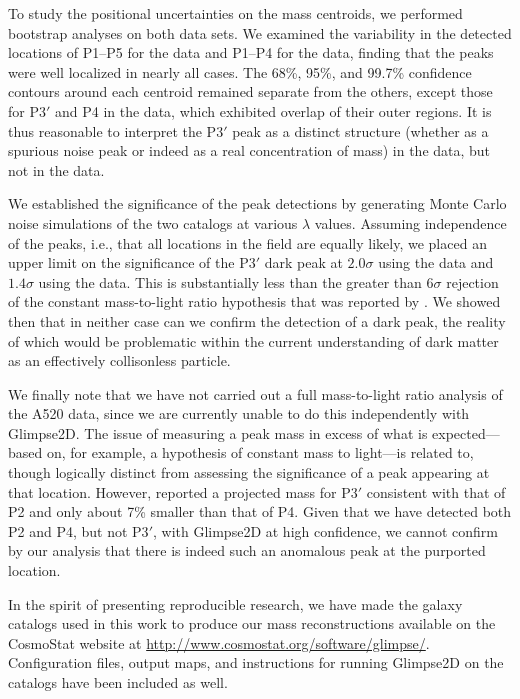 \documentclass[iop,twocolappendix]{emulateapj}
\newcommand{\cta}[1]{\citetalias{#1}}
\begin{document}
To study the positional uncertainties on the mass centroids, we performed bootstrap analyses on
both data sets. We examined the variability in the detected locations of P1--P5 for the \cta{C12} data 
and P1--P4 for the \cta{J14} data, finding that the peaks were well localized in nearly all cases. The
68\%, 95\%, and 99.7\% confidence contours around each centroid remained separate from the others, 
except those for P3$'$ and P4 in the \cta{C12} data, which exhibited overlap of their outer regions. 
It is thus reasonable to interpret the P3$'$ peak as a distinct structure (whether as a spurious 
noise peak or indeed as a real concentration of mass) in the \cta{J14} data, but not in the \cta{C12} data.

We established the significance of the peak detections by generating Monte Carlo noise
simulations of the two catalogs at various $\lambda$ values. Assuming independence of the peaks, i.e., that all
locations in the field are equally likely, we placed an upper limit on the significance of the P3$'$ dark 
peak at $2.0\sigma$ using the \cta{J14} data and $1.4\sigma$ using the \cta{C12} data.
This is substantially less than the greater than $6\sigma$ rejection of the constant mass-to-light ratio hypothesis 
that was reported by \cta{J14}. We showed then that in neither case can we confirm the detection of a dark 
peak, the reality of which would be problematic within the current understanding of dark matter as an
effectively collisonless particle.

We finally note that we have not carried out a full mass-to-light ratio analysis of the 
A520 data, since we are currently unable to do this independently with Glimpse2D. The issue of
measuring a peak mass in excess of what is expected---based on, for example, a hypothesis of constant
mass to light---is related to, though logically distinct from assessing the significance of a 
peak appearing at that location. However, \cta{J14} reported a projected mass for P3$'$ consistent
with that of P2 and only about 7\% smaller than that of P4. Given that we have detected both P2 
and P4, but not P3$'$, with Glimpse2D at high confidence, we cannot confirm by our analysis that 
there is indeed such an anomalous peak at the purported location.

In the spirit of presenting reproducible research, we have made the galaxy catalogs used in this work to
produce our mass reconstructions available on the CosmoStat
website at \url{http://www.cosmostat.org/software/glimpse/}. 
Configuration files, output maps, and instructions for running Glimpse2D on the catalogs have been included
as well.
\end{document}
